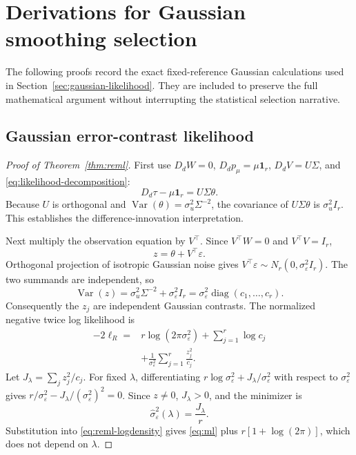 \section{Derivations for Gaussian smoothing selection}
\label{app:likelihood-proofs}
The following proofs record the exact fixed-reference
Gaussian calculations used in
Section~\ref{sec:gaussian-likelihood}.  They are
included to preserve the full mathematical argument
without interrupting the statistical selection narrative.

\subsection{Gaussian error-contrast likelihood}

\begin{proof}[Proof of Theorem~\ref{thm:reml}]
First use $D_dW=0$, $D_dp_\mu=\mu\mathbf1_r$,
$D_dV=U\Sigma$, and \eqref{eq:likelihood-decomposition}:
\begin{equation}\label{eq:likelihood-difference-innovation}
D_d\tau-\mu\mathbf1_r=U\Sigma\theta.
\end{equation}
Because $U$ is orthogonal and
$\operatorname{Var}(\theta)=
\sigma_u^2\Sigma^{-2}$, the covariance of
$U\Sigma\theta$ is $\sigma_u^2I_r$.
This establishes the difference-innovation interpretation.

Next multiply the observation equation by $V^\top$.
Since $V^\top W=0$ and $V^\top V=I_r$,
\begin{equation}\label{eq:contrast-observation-projection}
z=\theta+V^\top\varepsilon.
\end{equation}
Orthogonal projection of isotropic Gaussian
noise gives $V^\top\varepsilon\sim
N_r(0,\sigma_\varepsilon^2I_r)$.
The two summands are independent, so
\begin{equation}\label{eq:contrast-covariance-step}
\operatorname{Var}(z)=
\sigma_u^2\Sigma^{-2}
+\sigma_\varepsilon^2I_r
=\sigma_\varepsilon^2
\operatorname{diag}(c_1,\ldots,c_r).
\end{equation}
Consequently the $z_j$ are independent
Gaussian contrasts. The normalized negative
twice log likelihood is
\begin{equation}\label{eq:reml-logdensity}
\begin{aligned}
-2\ell_R={}&
r\log(2\pi\sigma_\varepsilon^2)
+\sum_{j=1}^r\log c_j\\
&+\frac1{\sigma_\varepsilon^2}
\sum_{j=1}^r\frac{z_j^2}{c_j}.
\end{aligned}
\end{equation}
Let $J_\lambda=\sum_jz_j^2/c_j$.
For fixed $\lambda$, differentiating
$r\log\sigma_\varepsilon^2+
J_\lambda/\sigma_\varepsilon^2$
with respect to $\sigma_\varepsilon^2$
gives $r/\sigma_\varepsilon^2
-J_\lambda/(\sigma_\varepsilon^2)^2=0$.
Since $z\ne0$, $J_\lambda>0$, and the
minimizer is
\begin{equation}\label{eq:reml-profile-step}
\widehat{\sigma}_\varepsilon^2(\lambda)
=\frac{J_\lambda}{r}.
\end{equation}
Substitution into \eqref{eq:reml-logdensity}
gives \eqref{eq:ml} plus
$r[1+\log(2\pi)]$, which does not depend on
$\lambda$.


\end{proof}
